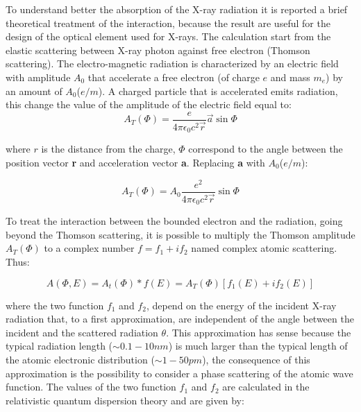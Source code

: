 To understand better the absorption of the X-ray radiation it is reported a brief theoretical treatment of the interaction, because the result are useful for the design of the optical element used for X-rays. The calculation start from the elastic scattering between  X-ray photon against free electron (Thomson scattering). The electro-magnetic radiation is characterized by an electric field with amplitude $A_0$ that accelerate a free electron (of charge $e $ and mass $m_e $) by an amount of $A_0 $($e / m $). A charged particle that is accelerated emits radiation, this change the value of the amplitude of the electric field equal to:
\begin{equation}
A_T(\Phi) = \frac{e}{4 \pi \epsilon_0 c^2 \vec{r}} \vec{a} \sin \Phi
\label{eq: At1}
\end{equation}
\begin{flushleft}
where $r $ is the distance from the charge, $\Phi $ correspond to the angle between the position vector \textbf{r} and acceleration vector \textbf{a}. Replacing \textbf{a} with $A_0 $($e / m $):
\end{flushleft}
\begin{equation}
A_T(\Phi) = A_0 \frac{e^2}{4 \pi \epsilon_0 c^2 \vec{r}} \sin \Phi
\label{eq: At2}
\end{equation}
\begin{flushleft}
To treat the interaction between the bounded electron and the radiation, going beyond the Thomson scattering, it is possible to multiply the Thomson amplitude $A_T (\Phi) $ to a complex number  $f = f_1 + if_2 $ named complex atomic scattering. Thus:
\end{flushleft}
\begin{equation}
A(\Phi, E) = A_t(\Phi) * f(E) = A_T(\Phi) [f_1(E) + if_2(E)]
\label{eq: A(fi, E)}
\end{equation}
\begin{flushleft}
where the two function $f_1 $ and $f_2 $, depend on the energy of the incident X-ray radiation that, to a first approximation, are independent of the angle between the incident and the scattered radiation $\theta $. This approximation has sense because the typical radiation length ($\sim 0.1-10nm $) is much larger than the typical length of the atomic electronic distribution ($\sim 1-50pm $), the consequence of this approximation is the possibility to consider a phase scattering of the atomic wave function. The values of the two function  $f_1 $ and $f_2 $ are calculated in the relativistic quantum dispersion theory \cite{cromer1970relativistic} and are given by:
\end{flushleft}
